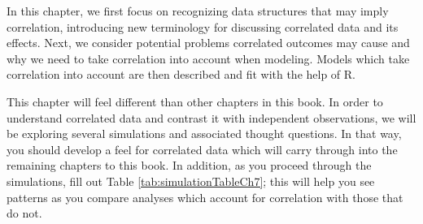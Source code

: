 \documentclass[
]{krantz}
\begin{document}
In this chapter, we first focus on recognizing data structures that may imply correlation, introducing new terminology for discussing correlated data and its effects. Next, we consider potential problems correlated outcomes may cause and why we need to take correlation into account when modeling. Models which take correlation into account are then described and fit with the help of R.

This chapter will feel different than other chapters in this book. In order to understand correlated data and contrast it with independent observations, we will be exploring several simulations and associated thought questions. In that way, you should develop a feel for correlated data which will carry through into the remaining chapters to this book. In addition, as you proceed through the simulations, fill out Table \ref{tab:simulationTableCh7}; this will help you see patterns as you compare analyses which account for correlation with those that do not.

\begin{table}

\caption{\label{tab:simulationTableCh7}Summary of simulations for Dams and Pups case study}
\centering
{}
\end{table}
\end{document}
